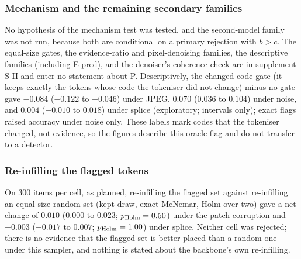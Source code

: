 \subsubsection{Mechanism and the remaining secondary families}
No hypothesis of the mechanism test was tested, and the second-model family was not run, because both are conditional on a primary rejection with
$b>c$.
The equal-size gates, the evidence-ratio and pixel-denoising families, the descriptive families (including E-pred), and the denoiser's
coherence check are in supplement S-II and enter no statement about P.
Descriptively, the changed-code gate (it keeps exactly the tokens whose code the tokeniser did not change) minus no gate gave
$-0.084$ ($-0.122$ to $-0.046$) under JPEG, $0.070$ ($0.036$ to $0.104$) under noise, and $0.004$ ($-0.010$ to $0.018$) under splice
(exploratory; intervals only); exact flags raised accuracy under noise only.
These labels mark codes that the tokeniser changed, not evidence, so the figures describe this oracle flag and do not transfer to a detector.

\subsubsection{Re-infilling the flagged tokens}
On 300 items per cell, as planned, re-infilling the flagged set against re-infilling an equal-size random set (kept draw, exact
McNemar, Holm over two) gave a net change of $0.010$ ($0.000$ to $0.023$; $p_{\rm Holm}=0.50$) under the patch corruption and $-0.003$ ($-0.017$ to $0.007$; $p_{\rm Holm}=1.00$) under
splice.
Neither cell was rejected; there is no evidence that the flagged set is better placed than a random one under this sampler, and nothing
is stated about the backbone's own re-infilling.

